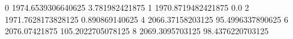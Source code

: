 0 1974.6539306640625 3.781982421875
1 1970.8719482421875 0.0
2 1971.7628173828125 0.890869140625
4 2066.37158203125 95.4996337890625
6 2076.07421875 105.2022705078125
8 2069.3095703125 98.4376220703125
